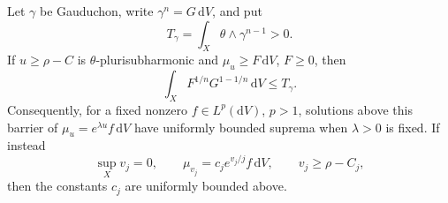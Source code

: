 \begin{proposition}\label{prop:big-singular-gauduchon-trace}
Let $\gamma$ be Gauduchon, write $\gamma^n=G\,\mathrm{d}V$, and put
\[
 T_\gamma=\int_X\theta\wedge\gamma^{n-1}>0.
\]
If $u\geq\rho-C$ is $\theta$-plurisubharmonic and $\mu_u\geq F\,\mathrm{d}V$, $F\geq0$, then
\begin{equation}\label{eq:big-singular-gauduchon-trace}
 \int_X F^{1/n}G^{1-1/n}\,\mathrm{d}V\leq T_\gamma.
\end{equation}
Consequently, for a fixed nonzero $f\in L^p(\mathrm{d}V)$, $p>1$, solutions above this barrier of
$\mu_u=e^{\lambda u}f\,\mathrm{d}V$ have uniformly bounded suprema when $\lambda>0$ is fixed. If instead
\[
 \sup_Xv_j=0,\qquad
 \mu_{v_j}=c_j e^{v_j/j}f\,\mathrm{d}V,
 \qquad v_j\geq\rho-C_j,
\]
then the constants $c_j$ are uniformly bounded above.
\end{proposition}
